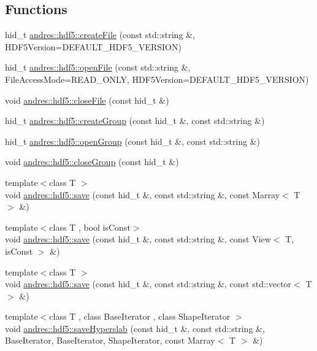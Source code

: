 \subsection*{Functions}
\begin{DoxyCompactItemize}
\item 
hid\+\_\+t \hyperlink{namespaceandres_1_1hdf5_a1f779b6e42349512d5227fbb6dcf92cd}{andres\+::hdf5\+::create\+File} (const std\+::string \&, H\+D\+F5\+Version=D\+E\+F\+A\+U\+L\+T\+\_\+\+H\+D\+F5\+\_\+\+V\+E\+R\+S\+I\+ON)
\item 
hid\+\_\+t \hyperlink{namespaceandres_1_1hdf5_a3645de3466468274059f8475066ff820}{andres\+::hdf5\+::open\+File} (const std\+::string \&, File\+Access\+Mode=R\+E\+A\+D\+\_\+\+O\+N\+LY, H\+D\+F5\+Version=D\+E\+F\+A\+U\+L\+T\+\_\+\+H\+D\+F5\+\_\+\+V\+E\+R\+S\+I\+ON)
\item 
void \hyperlink{namespaceandres_1_1hdf5_afa6545825e5557eecf6ac1e8fc68bb56}{andres\+::hdf5\+::close\+File} (const hid\+\_\+t \&)
\item 
hid\+\_\+t \hyperlink{namespaceandres_1_1hdf5_ac03dd5212231c5335a0a02edb3c0d879}{andres\+::hdf5\+::create\+Group} (const hid\+\_\+t \&, const std\+::string \&)
\item 
hid\+\_\+t \hyperlink{namespaceandres_1_1hdf5_a3d7159f65f86576c9142409b08afcfc9}{andres\+::hdf5\+::open\+Group} (const hid\+\_\+t \&, const std\+::string \&)
\item 
void \hyperlink{namespaceandres_1_1hdf5_a1aaf506863ec820cdcc827c7997d4ba3}{andres\+::hdf5\+::close\+Group} (const hid\+\_\+t \&)
\item 
{\footnotesize template$<$class T $>$ }\\void \hyperlink{namespaceandres_1_1hdf5_a0bc471ab828dcfdedd90dc6f991b509e}{andres\+::hdf5\+::save} (const hid\+\_\+t \&, const std\+::string \&, const Marray$<$ T $>$ \&)
\item 
{\footnotesize template$<$class T , bool is\+Const$>$ }\\void \hyperlink{namespaceandres_1_1hdf5_ac6995803b0ec6079698d61563b5de104}{andres\+::hdf5\+::save} (const hid\+\_\+t \&, const std\+::string \&, const View$<$ T, is\+Const $>$ \&)
\item 
{\footnotesize template$<$class T $>$ }\\void \hyperlink{namespaceandres_1_1hdf5_a541f5c1613746f236ecc7e0035fa8919}{andres\+::hdf5\+::save} (const hid\+\_\+t \&, const std\+::string \&, const std\+::vector$<$ T $>$ \&)
\item 
{\footnotesize template$<$class T , class Base\+Iterator , class Shape\+Iterator $>$ }\\void \hyperlink{namespaceandres_1_1hdf5_a8b3c6fd3570f7452b1507bf5cf48dfc5}{andres\+::hdf5\+::save\+Hyperslab} (const hid\+\_\+t \&, const std\+::string \&, Base\+Iterator, Base\+Iterator, Shape\+Iterator, const Marray$<$ T $>$ \&)

\end{DoxyCompactItemize}
